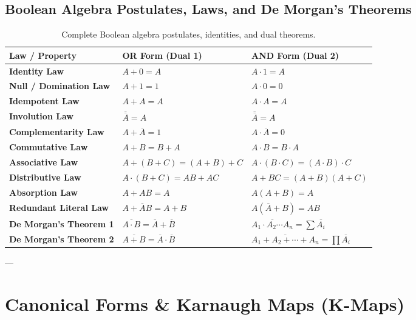\subsection{Boolean Algebra Postulates, Laws, and De Morgan's Theorems}

\begin{table}[htbp]
\centering
\small
\begin{tabularx}{\textwidth}{lXX}
\toprule
\textbf{Law / Property} & \textbf{OR Form (Dual 1)} & \textbf{AND Form (Dual 2)} \\
\midrule
\textbf{Identity Law} & $A + 0 = A$ & $A \cdot 1 = A$ \\
\textbf{Null / Domination Law} & $A + 1 = 1$ & $A \cdot 0 = 0$ \\
\textbf{Idempotent Law} & $A + A = A$ & $A \cdot A = A$ \\
\textbf{Involution Law} & $\overline{\overline{A}} = A$ & $\overline{\overline{A}} = A$ \\
\textbf{Complementarity Law} & $A + \overline{A} = 1$ & $A \cdot \overline{A} = 0$ \\
\textbf{Commutative Law} & $A + B = B + A$ & $A \cdot B = B \cdot A$ \\
\textbf{Associative Law} & $A + (B + C) = (A + B) + C$ & $A \cdot (B \cdot C) = (A \cdot B) \cdot C$ \\
\textbf{Distributive Law} & $A \cdot (B + C) = AB + AC$ & $A + BC = (A + B)(A + C)$ \\
\textbf{Absorption Law} & $A + AB = A$ & $A(A + B) = A$ \\
\textbf{Redundant Literal Law} & $A + \overline{A}B = A + B$ & $A(\overline{A} + B) = AB$ \\
\textbf{De Morgan's Theorem 1} & $\overline{A \cdot B} = \overline{A} + \overline{B}$ & $\overline{A_1 \cdot A_2 \cdots A_n} = \sum \overline{A_i}$ \\
\textbf{De Morgan's Theorem 2} & $\overline{A + B} = \overline{A} \cdot \overline{B}$ & $\overline{A_1 + A_2 + \cdots + A_n} = \prod \overline{A_i}$ \\
\bottomrule
\end{tabularx}
\caption{Complete Boolean algebra postulates, identities, and dual theorems.}
\label{tab:boolean-laws}
\end{table}

---

\section{Canonical Forms \& Karnaugh Maps (K-Maps)}

